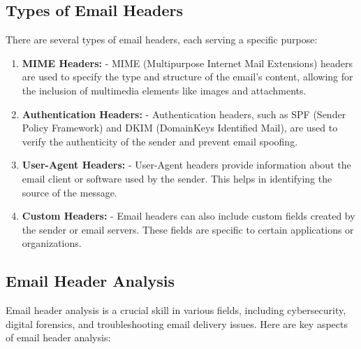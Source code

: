 \documentclass[11pt]{article}
\begin{document}
\subsection{Types of Email Headers}

There are several types of email headers, each serving a specific purpose:

\begin{enumerate}
    \item \textbf{MIME Headers:}
          - MIME (Multipurpose Internet Mail Extensions) headers are used to specify the type and structure of the email's content, allowing for the inclusion of multimedia elements like images and attachments.

    \item \textbf{Authentication Headers:}
          - Authentication headers, such as SPF (Sender Policy Framework) and DKIM (DomainKeys Identified Mail), are used to verify the authenticity of the sender and prevent email spoofing.

    \item \textbf{User-Agent Headers:}
          - User-Agent headers provide information about the email client or software used by the sender. This helps in identifying the source of the message.

    \item \textbf{Custom Headers:}
          - Email headers can also include custom fields created by the sender or email servers. These fields are specific to certain applications or organizations.
\end{enumerate}

\subsection{Email Header Analysis}

Email header analysis is a crucial skill in various fields, including cybersecurity, digital forensics, and troubleshooting email delivery issues. Here are key aspects of email header analysis:
\end{document}
